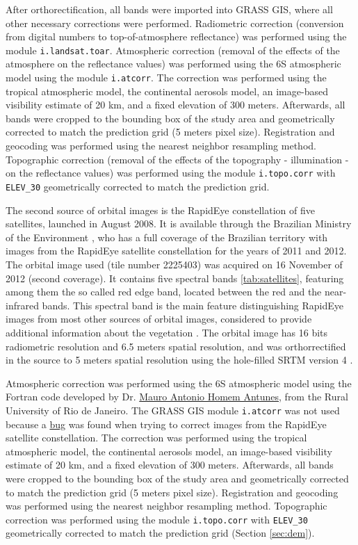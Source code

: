 After orthorectification, all bands were imported into GRASS GIS, where all other necessary corrections were performed. Radiometric correction (conversion from digital numbers to top-of-atmosphere reflectance) was performed using the module \texttt{i.landsat.toar}. Atmospheric correction (removal of the effects of the atmosphere on the reflectance values) was performed using the 6S atmospheric model \citep{VermoteEtAl1997} using the module \texttt{i.atcorr}. The correction was performed using the tropical atmospheric model, the continental aerosols model, an image-based visibility estimate of 20 km, and a fixed elevation of 300 meters. Afterwards, all bands were cropped to the bounding box of the study area and geometrically corrected to match the prediction grid (5 meters pixel size). Registration and geocoding was performed using the nearest neighbor resampling method. Topographic correction (removal of the effects of the topography - illumination - on the reflectance values) was performed using the module \texttt{i.topo.corr} with \texttt{ELEV\_30} geometrically corrected to match the prediction grid.

The second source of orbital images is the RapidEye constellation of five satellites, launched in August 2008. It is available through the Brazilian Ministry of the Environment \citep{Brasil2012}, who has a full coverage of the Brazilian territory with images from the RapidEye satellite constellation for the years of 2011 and 2012. The orbital image used (tile number 2225403) was acquired on 16 November of 2012 (second coverage). It contains five spectral bands \ref{tab:satellites}, featuring among them the so called red edge band, located between the red and the near-infrared bands. This spectral band is the main feature distinguishing RapidEye images from most other sources of orbital images, considered to provide additional information about the vegetation \citep{WeicheltEtAl2013}. The orbital image has 16 bits radiometric resolution and 6.5 meters spatial resolution, and was orthorrectified in the source to 5 meters spatial resolution using the hole-filled SRTM version 4 \citep{RapidEye2013}.

Atmospheric correction was performed using the 6S atmospheric model \citep{VermoteEtAl1997} using the Fortran code developed by Dr. \href{http://lattes.cnpq.br/3818721407909667}{Mauro Antonio Homem Antunes}, from the Rural University of Rio de Janeiro. The GRASS GIS module \texttt{i.atcorr} was not used because a \href{http://osgeo-org.1560.x6.nabble.com/i-atcorr-returns-nan-for-Landsat-5-TM-bands-1-and-2-tt5106456.html#a5118122}{bug} was found when trying to correct images from the RapidEye satellite constellation. The correction was performed using the tropical atmospheric model, the continental aerosols model, an image-based visibility estimate of 20 km, and a fixed elevation of 300 meters. Afterwards, all bands were cropped to the bounding box of the study area and geometrically corrected to match the prediction grid (5 meters pixel size). Registration and geocoding was performed using the nearest neighbor resampling method. Topographic correction was performed using the module \texttt{i.topo.corr} with \texttt{ELEV\_30} geometrically corrected to match the prediction grid (Section \ref{sec:dem}).

